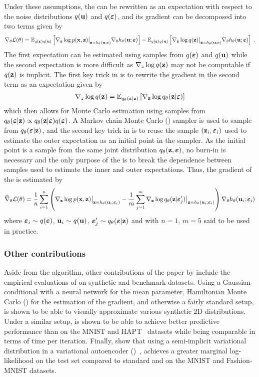\documentclass[10pt]{article}
\begin{document}
Under these assumptions, the \elbo can be rewritten as an expectation with respect to the noise distributions $q(\mathbf{u})$ and $q(\bm{\varepsilon})$, and its gradient can be decomposed into two terms given by
\[
\nabla_\theta \mathcal{L}(\theta) = \mathbb{E}_{q(\bm{\varepsilon})q(\mathbf{u})}\left[\nabla_{\mathbf{z}} \log p(\mathbf{x},\mathbf{z})\big|_{\mathbf{z}=h_\theta(\mathbf{u};\bm{\varepsilon})}\nabla_\theta h_\theta(\mathbf{u};\bm{\varepsilon})\right] - \mathbb{E}_{q(\bm{\varepsilon})q(\mathbf{u})}\left[\nabla_{\mathbf{z}} \log q(\mathbf{z})\big|_{\mathbf{z}=h_\theta(\mathbf{u};\bm{\varepsilon})}\nabla_\theta h_\theta(\mathbf{u};\bm{\varepsilon})\right] \;.
\]
The first expectation can be estimated using samples from $q(\bm{\varepsilon})$ and $q(\mathbf{u})$ while the second expectation is more difficult as $\nabla_z\log q(\mathbf{z})$ may not be computable if $q(\mathbf{z})$ is implicit. The first key trick in \uivi is to rewrite the gradient in the second term as an expectation given by
\[
\nabla_z\log q(\mathbf{z}) = \mathbb{E}_{q_\theta(\bm{\varepsilon}|\mathbf{z})}\left[\nabla_{\mathbf{z}}\log q_\theta(\mathbf{z}|\bm{\varepsilon})\right]
\]
which then allows for Monte Carlo estimation using samples from $q_\theta(\bm{\varepsilon}|\mathbf{z})\propto q_\theta(\mathbf{z}|\bm{\varepsilon})q(\bm{\varepsilon})$. A Markov chain Monte Carlo (\mcmc) sampler is used to sample from $q_\theta(\bm{\varepsilon}|\mathbf{z})$, and the second key trick in \uivi is to reuse the sample $(\mathbf{z}_i,\bm{\varepsilon}_i)$ used to estimate the outer expectation as an initial point in the \mcmc sampler. As the initial point is a sample from the same joint distribution $q_\theta(\mathbf{z},\bm{\varepsilon})$, no burn-in is necessary and the only purpose of the \mcmc is to break the dependence between samples used to estimate the inner and outer expectations. Thus, the gradient of the \elbo is estimated by
\[
\widehat{\nabla}_\theta\mathcal{L}(\theta) = \frac{1}{n}\sum_{i=1}^n \left(\nabla_{\mathbf{z}}\log p(\mathbf{x},\mathbf{z})\big|_{\mathbf{z}=h_\theta(\mathbf{u}_i;\bm{\varepsilon}_i)} - \frac{1}{m}\sum_{j=1}^m \nabla_{\mathbf{z}}\log q_\theta(\mathbf{z}|\bm{\varepsilon}_j')\big|_{\mathbf{z}=h_\theta(\mathbf{u}_i;\bm{\varepsilon}_i)} \right)\nabla_\theta h_\theta(\mathbf{u}_i;\bm{\varepsilon}_i)
\]
where $\bm{\varepsilon}_i\sim q(\bm{\varepsilon})$, $\mathbf{u}_i\sim q(\mathbf{u})$, $\bm{\varepsilon}_j'\sim q_\theta(\bm{\varepsilon}|\mathbf{z})$ and with $n=1$, $m=5$ said to be used in practice.

\subsubsection{Other contributions}

Aside from the \uivi algorithm, other contributions of the paper by \citet{Titsias:2019} include the empirical evaluations of \uivi on synthetic and benchmark datasets. Using a Gaussian conditional with a neural network for the mean parameter, Hamiltonian Monte Carlo (\hmc) for the \mcmc estimation of the \elbo gradient, and otherwise a fairly standard setup, \uivi is shown to be able to visually approximate various synthetic 2D distributions. Under a similar setup, \uivi is shown to be able to achieve better predictive performance than \sivi on the MNIST and HAPT~\citep{Reyes:2014} datasets while being comparable in terms of time per iteration. Finally, \citet{Titsias:2019} show that using a semi-implicit variational distribution in a variational autoencoder (\vae)~\citep{Kingma:2013}, \uivi achieves a greater marginal log-likelihood on the test set compared to standard \vae and \sivi on the MNIST and Fashion-MNIST datasets.
\end{document}
